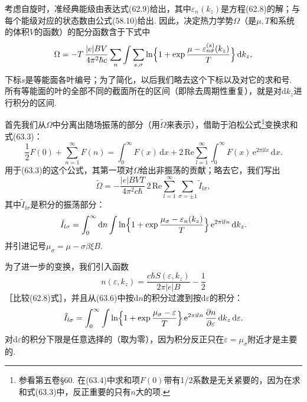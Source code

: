 考虑自旋时，准经典能级由表达式(62.9)给出，其中$\varepsilon_n(k_z)$是方程(62.8)的解；与每个能级对应的状态数由公式(58.10)给出. 因此，决定热力学势$\Omega$（是$\mu,T$和系统的体积$V$的函数）的配分函数含于下式中
\begin{equation}
\Omega=-T\,\frac{|e|BV}{4\pi^2\hbar c}\sum_n\int\sum_{s,\sigma}
\ln\Bigl\{1+\exp\frac{\mu-\varepsilon^{(s)}_{n\sigma}(k_z)}{T}\Bigr\}\,\mathrm{d}k_z,
\end{equation}
下标$s$是等能面各叶编号；为了简化，以后我们略去这个下标以及对它的求和号. 所有等能面的叶的全部不同的截面所在的区间（即除去周期性重复），就是对$\mathrm{d}k_z$进行积分的区间.

首先我们从$\Omega$中分离出随场振荡的部分（用$\widetilde{\Omega}$来表示），借助于泊松公式\footnote{参看第五卷§60. 在(63.4)中求和项$F(0)$带有1/2系数是无关紧要的，因为在求和式(63.3)中，反正重要的只有$n$大的项.}变换求和式(63.3)：
\begin{equation}
\frac{1}{2}F(0)+\sum_{n=1}^{\infty}F(n)=\int_0^{\infty}F(x)\,\mathrm{d}x
+2\,\mathrm{Re}\sum_{l=1}^{\infty}\int_0^{\infty}F(x)\,\mathrm{e}^{2\pi\mathrm{i}lx}\,\mathrm{d}x.
\end{equation}
用于(63.3)的这个公式，其第一项对$\Omega$给出非振荡的贡献；略去它，我们写出
\begin{equation}
\widetilde{\Omega}=-\frac{|e|BVT}{4\pi^2c\hbar}\,
2\,\mathrm{Re}\sum_{l=1}^{\infty}\sum_{\sigma=\pm1}\tilde{I}_{l\sigma},
\end{equation}
其中$\tilde{I}_{l\sigma}$是积分的振荡部分：
\begin{equation}
\tilde{I}_{l\sigma}=\int_0^{\infty}\mathrm{d}n\int
\ln\Bigl\{1+\exp\frac{\mu_\sigma-\varepsilon_n(k_z)}{T}\Bigr\}\,
\mathrm{e}^{2\pi\mathrm{i}ln}\,\mathrm{d}k_z.
\end{equation}
并引进记号$\mu_\sigma=\mu-\sigma\beta\xi B$.

为了进一步的变换，我们引入函数
\begin{equation}
n(\varepsilon,k_z)=\frac{c\hbar S(\varepsilon,k_z)}{2\pi|e|B}-\frac{1}{2}
\end{equation}
［比较(62.8)式］，并且从(63.6)中按$\mathrm{d}n$的积分过渡到按$\mathrm{d}\varepsilon$的积分：
\begin{equation}
\tilde{I}_{l\sigma}=\int_0^{\infty}\int
\ln\Bigl\{1+\exp\frac{\mu_\sigma-\varepsilon}{T}\Bigr\}\,
\mathrm{e}^{2\pi\mathrm{i}ln}\,\frac{\partial n}{\partial\varepsilon}\,
\mathrm{d}k_z\,\mathrm{d}\varepsilon.
\end{equation}
对$\mathrm{d}\varepsilon$的积分下限是任意选择的（取为零），因为积分反正只在$\varepsilon=\mu_\sigma$附近才是主要的.

